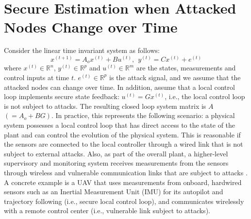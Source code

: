\documentclass[../../thesis.tex]{subfiles}
\begin{document}
\section{Secure Estimation when Attacked Nodes Change over Time }  \label{sec:main}


Consider the linear time invariant system as follows:
\begin{equation}
x^{(t+1)} = A_o x^{(t)} + B u^{(t)}, ~~ y^{(t)} = C x ^{(t)} + e^{(t) }
\label{eq:system_model_se}
\end{equation} 
where $x^{(t)} \in \mathbb{R}^n$, $y^{(t)}  \in \mathbb{R}^p$ and $u^{(t)} \in \mathbb{R}^m$ are the states, measurements and control inputs at time $t$. $e^{(t)} \in \mathbb{R}^p$ is the attack signal, and we assume that the attacked nodes can change over time. 
In addition, assume that a local control loop implements secure state feedback: $u^{(t)} = Gx^{(t)}$, i.e., the local control loop is not subject to attacks. The resulting closed loop system matrix is $A$ $(=A_o+BG)$. 
In practice, this represents the following scenario: a physical system possesses a local control loop that has direct access to the state of the plant and can control the evolution of the physical system. This is reasonable if the sensors are connected to the local controller through a wired link that is not subject to external attacks. Also, as part of the overall plant, a higher-level supervisory and monitoring system receives measurements from the sensors through wireless and vulnerable communication links that are subject to attacks \cite{Fawzi2014}. 
A concrete example is a UAV that uses measurements from onboard, hardwired sensors such as an Inertial Measurement Unit (IMU) for its autopilot and trajectory following (i.e., secure local control loop), and communicates wirelessly with a remote control center (i.e., vulnerable link subject to attacks).%
\end{document}
